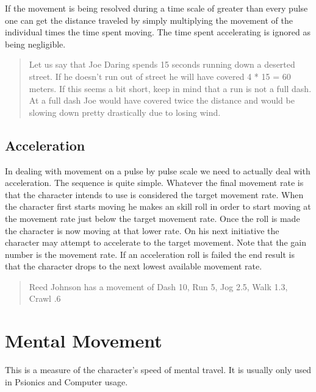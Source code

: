 

If the movement is being resolved during a time scale of greater than every
pulse one can get the distance traveled by simply multiplying the movement 
of the individual times the time spent moving. The time spent accelerating
is ignored as being negligible.

\begin{quote}
Let us say that Joe Daring spends 15 seconds running down a deserted street.
If he doesn't run out of street he will have covered 4 * 15 = 60 meters. If 
this seems a bit short, keep in mind that a run is not a full dash. At a full
dash Joe would have covered twice the distance and would be slowing down pretty 
drastically due to losing wind.
\end{quote}

\subsection{Acceleration}


In dealing with movement on a pulse by pulse scale we need to actually
deal with acceleration. The sequence is quite simple. Whatever the
final movement  rate is that the character intends to use is considered
the target movement rate. When the character first starts moving he
makes an skill roll in order to start moving at the movement
rate just below the target movement rate. Once the roll is made the
character is now moving at that lower rate. On his next  initiative the
character may attempt to accelerate to the target movement. Note  that
the gain number is the movement rate. If an acceleration roll is failed
the end result is that the character drops to the next lowest available
movement  rate. 

\begin{quotation}
Reed Johnson has a movement of Dash 10, Run 5, Jog 2.5, Walk 1.3, Crawl .6
\end{quotation}



\section{Mental Movement}
This is a measure of the character's speed of mental travel. It is 
usually only used in Psionics and Computer usage.

